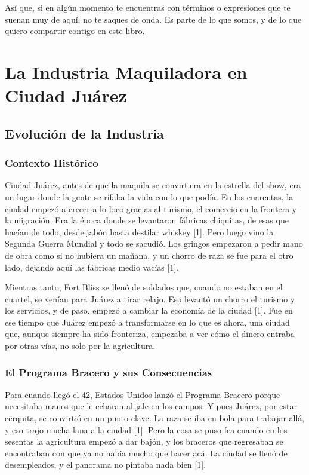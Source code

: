 \documentclass[
  10pt,
  letterpaper,
]{book}
\begin{document}
Así que, si en algún momento te encuentras con términos o expresiones
que te suenan muy de aquí, no te saques de onda. Es parte de lo que
somos, y de lo que quiero compartir contigo en este libro.


\chapter{La Industria Maquiladora en Ciudad
Juárez}\label{la-industria-maquiladora-en-ciudad-juuxe1rez}

\section{Evolución de la Industria}\label{evoluciuxf3n-de-la-industria}

\subsection{Contexto Histórico}\label{contexto-histuxf3rico}

Ciudad Juárez, antes de que la maquila se convirtiera en la estrella del
show, era un lugar donde la gente se rifaba la vida con lo que podía. En
los cuarentas, la ciudad empezó a crecer a lo loco gracias al turismo,
el comercio en la frontera y la migración. Era la época donde se
levantaron fábricas chiquitas, de esas que hacían de todo, desde jabón
hasta destilar whiskey {[}1{]}. Pero luego vino la Segunda Guerra
Mundial y todo se sacudió. Los gringos empezaron a pedir mano de obra
como si no hubiera un mañana, y un chorro de raza se fue para el otro
lado, dejando aquí las fábricas medio vacías {[}1{]}.

Mientras tanto, Fort Bliss se llenó de soldados que, cuando no estaban
en el cuartel, se venían para Juárez a tirar relajo. Eso levantó un
chorro el turismo y los servicios, y de paso, empezó a cambiar la
economía de la ciudad {[}1{]}. Fue en ese tiempo que Juárez empezó a
transformarse en lo que es ahora, una ciudad que, aunque siempre ha sido
fronteriza, empezaba a ver cómo el dinero entraba por otras vías, no
solo por la agricultura.

\subsection{El Programa Bracero y sus
Consecuencias}\label{el-programa-bracero-y-sus-consecuencias}

Para cuando llegó el 42, Estados Unidos lanzó el Programa Bracero porque
necesitaba manos que le echaran al jale en los campos. Y pues Juárez,
por estar cerquita, se convirtió en un punto clave. La raza se iba en
bola para trabajar allá, y eso trajo mucha lana a la ciudad {[}1{]}.
Pero la cosa se puso fea cuando en los sesentas la agricultura empezó a
dar bajón, y los braceros que regresaban se encontraban con que ya no
había mucho que hacer acá. La ciudad se llenó de desempleados, y el
panorama no pintaba nada bien {[}1{]}.
\end{document}
